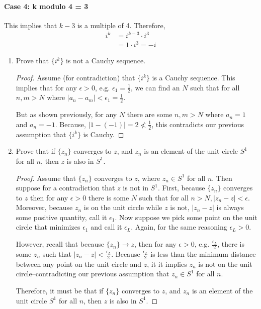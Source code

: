 \documentclass[11pt]{article}
\begin{document}
\paragraph{Case 4: k modulo 4 = 3} This implies that $k - 3$ is a multiple of 4. Therefore,
\[\begin{aligned}
i^k
&= i^{k-3} \cdot i^3 \\
&= 1 \cdot i^3 = -i
\end{aligned}
\]

\begin{enumerate}
	\item Prove that $\{i^k\}$ is not a Cauchy sequence.
	
	\begin{proof}
		Assume (for contradiction) that $\{i^k\}$ is a Cauchy sequence. This implies that for any $\epsilon > 0$, e.g. $\epsilon_1 = \frac{1}{2}$, we can find an $N$ such that for all $n, m > N$ where $|a_n - a_m| < \epsilon_1 = \frac{1}{2}$.
		
		\bigskip
		
		But as shown previously, for any $N$ there are some $n, m > N$ where $a_n = 1$ and $a_n = -1$. Because, $| 1 - (-1)| = 2 \nless \frac{1}{2}$, this contradicts our previous assumption that $\{i^k\}$ is Cauchy.
	\end{proof}
	
	\item Prove that if $\{z_n\}$ converges to $z$, and $z_n$ is an element of the unit circle $S^1$ for all $n$, then $z$ is also in $S^1$.
	
	\begin{proof}
		Assume that $\{z_n\}$ converges to $z$, where $z_n \in S^1$ for all $n$. 
		Then suppose for a contradiction that $z$ is not in $S^1$. First, because $\{z_n\}$ converges to $z$ then for any $\epsilon > 0$ there is some $N$ such that for all $n > N, |z_n - z| < \epsilon$. Moreover, because $z_n$ is on the unit circle while $z$ is not, $|z_n - z|$ is always some positive quantity, call it $\epsilon_1$. Now suppose we pick some point on the unit circle that minimizes $\epsilon_1$ and call it $\epsilon_L$. Again, for the same reasoning $\epsilon_L > 0$.
		
		\bigskip
		
		However, recall that because $\{z_n\} \rightarrow z$, then for any $\epsilon > 0$, e.g. $\frac{\epsilon_L}{2}$, there is some $z_n$ such that $|z_n - z| < \frac{\epsilon_L}{2}$. Because $\frac{\epsilon_L}{2}$ is less than the minimum distance between any point on the unit circle and $z$, it it implies $z_n$ is not on the unit circle--contradicting our previous assumption that $z_n \in S^1$ for all $n$.
		
		\bigskip
		
		 Therefore, it must be that if $\{z_n\}$ converges to $z$, and $z_n$ is an element of the unit circle $S^1$ for all $n$, then $z$ is also in $S^1$.
	\end{proof}
\end{enumerate}
\end{document}
